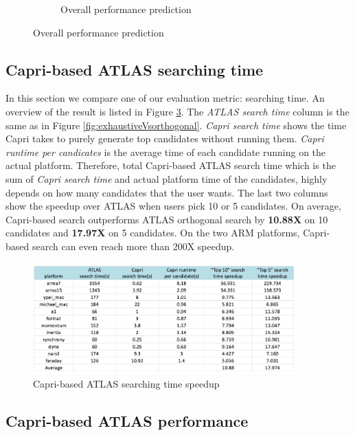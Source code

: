 \begin{figure}[bhp]
\begin{subfigure}[b]{1.0\linewidth}
      \caption{Overall performance prediction}
      \label{fig:overall_pref}
    \end{subfigure}
  \end{figure}


  
  \subsection{Capri-based ATLAS searching time}
  \label{sec:capri_atlas_searching}
  In this section we compare one of our evaluation metric: searching time. An overview of the result is listed in
  Figure \ref{fig:search_time}. The \textit{ATLAS search time} column is the same as in Figure \ref{fig:exhaustiveVsorthogonal}.
  \textit{Capri search time} shows the time Capri takes to purely generate top candidates without running them. 
  \textit{Capri runtime per candicates} is the average time of each candidate running on the actual platform.
  Therefore, total Capri-based ATLAS search time which is the sum of \textit{Capri search time} and actual platform time of the candidates,
  highly depends on how many candidates that the user wants. The last two columns show the speedup over ATLAS when users pick
  10 or 5 candidates. On average, Capri-based search outperforms ATLAS orthogonal search by \textbf{10.88X} on 10 candidates and \textbf{17.97X} on 
  5 candidates. On the two ARM platforms, Capri-based search can even reach more than 200X speedup.
  


  \begin{figure}[tbhp]
    \centering
    \includegraphics[width=0.9\textwidth]{images/timespeedup.png}
    \caption{Capri-based ATLAS searching time speedup}
    \label{fig:search_time}
  \end{figure}

  \subsection{Capri-based ATLAS performance}
  \label{sec:capri_atlas_performance}

